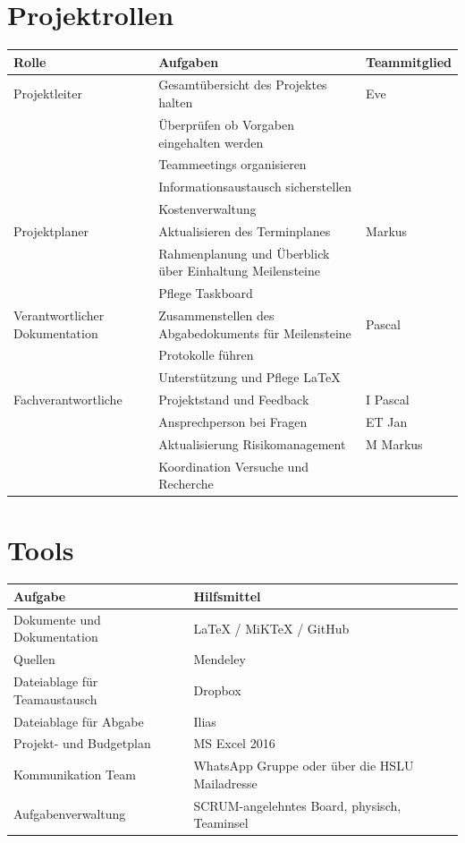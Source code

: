 \documentclass[a4paper]{report}
\begin{document}
\section{Projektrollen}

\begin{tabular}{|p{}|p{}|p{}|}
	\hline
	\textbf{Rolle} & \textbf{Aufgaben} & \textbf{Teammitglied} \\
	\hline
	Projektleiter & Gesamtübersicht des Projektes halten  & Eve \\
	& Überprüfen ob Vorgaben eingehalten werden & \\
	& Teammeetings organisieren & \\
	& Informationsaustausch sicherstellen & \\
	& Kostenverwaltung & \\
	\hline
	Projektplaner & Aktualisieren des Terminplanes & Markus\\
	& Rahmenplanung und Überblick über Einhaltung Meilensteine& \\
	& Pflege Taskboard & \\
	\hline
	Verantwortlicher Dokumentation& Zusammenstellen des Abgabedokuments für Meilensteine & Pascal \\
	& Protokolle führen & \\
	& Unterstützung und Pflege LaTeX &  \\
	\hline
	Fachverantwortliche & Projektstand und Feedback & I Pascal \\
	& Ansprechperson bei Fragen & ET Jan\\
	& Aktualisierung Risikomanagement & M Markus\\
	& Koordination Versuche und Recherche & \\
	\hline
\end{tabular}

\section{Tools}
\begin{tabular}{|p{}|p{}|}
	\hline
	\textbf{Aufgabe} & \textbf{Hilfsmittel} \\
	\hline
	Dokumente und Dokumentation & LaTeX / MiKTeX / GitHub \\
	\hline
	Quellen & Mendeley \\
	\hline
	Dateiablage für Teamaustausch & Dropbox \\
	\hline
	Dateiablage für Abgabe & Ilias \\
	\hline
	Projekt- und Budgetplan & MS Excel 2016 \\
	\hline
	Kommunikation Team & WhatsApp Gruppe oder über die HSLU Mailadresse\\
	\hline
	Aufgabenverwaltung & SCRUM-angelehntes Board, physisch, Teaminsel\\
	\hline
\end{tabular}
\end{document}
